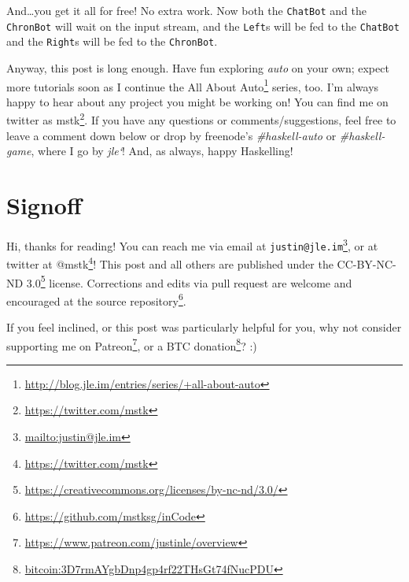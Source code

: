 \documentclass[]{article}
\renewcommand{\href}[2]{#2\footnote{\url{#1}}}
\begin{document}
And\ldots you get it all for free! No extra work. Now both the \texttt{ChatBot}
and the \texttt{ChronBot} will wait on the input stream, and the \texttt{Left}s
will be fed to the \texttt{ChatBot} and the \texttt{Right}s will be fed to the
\texttt{ChronBot}.

Anyway, this post is long enough. Have fun exploring \emph{auto} on your own;
expect more tutorials soon as I continue the
\href{http://blog.jle.im/entries/series/+all-about-auto}{All About Auto} series,
too. I'm always happy to hear about any project you might be working on! You can
find me on twitter as \href{https://twitter.com/mstk}{mstk}. If you have any
questions or comments/suggestions, feel free to leave a comment down below or
drop by freenode's \emph{\#haskell-auto} or \emph{\#haskell-game}, where I go by
\emph{jle`}! And, as always, happy Haskelling!

\section{Signoff}\label{signoff}

Hi, thanks for reading! You can reach me via email at
\href{mailto:justin@jle.im}{\nolinkurl{justin@jle.im}}, or at twitter at
\href{https://twitter.com/mstk}{@mstk}! This post and all others are published
under the \href{https://creativecommons.org/licenses/by-nc-nd/3.0/}{CC-BY-NC-ND
3.0} license. Corrections and edits via pull request are welcome and encouraged
at \href{https://github.com/mstksg/inCode}{the source repository}.

If you feel inclined, or this post was particularly helpful for you, why not
consider \href{https://www.patreon.com/justinle/overview}{supporting me on
Patreon}, or a \href{bitcoin:3D7rmAYgbDnp4gp4rf22THsGt74fNucPDU}{BTC donation}?
:)
\end{document}
